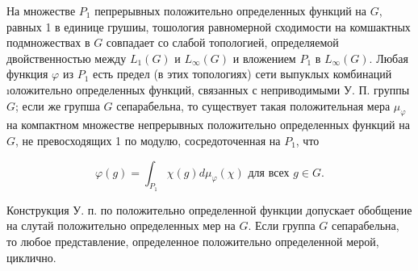 \documentclass[10pt]{article}
\begin{document}
На множестве $P_{1}$ пепрерывных положительно определенных функций на $G$, равных 1 в единице грушиы, тошология равномерной сходимости на комшактных подмножествах в $G$ совпадает со слабой топологией, определяемой двойственностью между $L_{1}(G)$ и $L_{\infty}(G)$ и вложением $P_{1}$ в $L_{\infty}(G)$. Любая функция $\varphi$ из $P_{1}$ есть предел (в этих топологиях) сети выпуклых комбинаций ıоложительно определенных функций, связанных с неприводимыми У. П. группы $G$; если же групша $G$ сепарабельна, то существует такая положительная мера $\mu_{\varphi}$ на компактном множестве непрерывных положительно определенных функций на $G$, не превосходящих 1 по модулю, сосредоточенная на $P_{1}$, что



\[

\varphi(g)=\int_{P_{1}} \chi(g) d \mu_{\varphi}(\chi) \text { для всех } g \in G .

\]



Конструкция У. п. по положительно определенной функции допускает обобщение на слутай положительно определенных мер на $G$. Если группа $G$ сепарабельна, то любое представление, определенное положительно определенной мерой, циклично.
\end{document}
